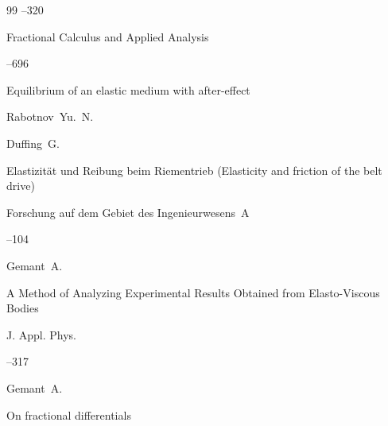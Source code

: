 \documentclass[11pt,a4paper,twoside]{article}
\begin{document}
\begin{thebibliography}{99}
--320









\jour Fractional Calculus and Applied Analysis








--696


\paper  Equilibrium of an elastic medium with after-effect


\by Rabotnov~Yu.~N.














\by Duffing~G.


\paper Elastizit\"at und Reibung beim Riementrieb (Elasticity and friction of the belt drive)


\jour Forschung auf dem Gebiet des Ingenieurwesens~A






--104














\by Gemant~A.


\paper A Method of Analyzing Experimental Results Obtained from Elasto-Viscous Bodies 


\jour J. Appl. Phys.






--317









\by Gemant~A. 


\paper On fractional differentials



\end{thebibliography}
\end{document}
